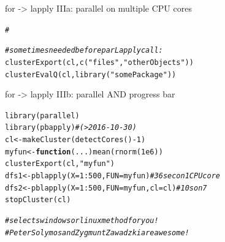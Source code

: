 \documentclass[xcolor=table,           xcolor=dvipsnames]{beamer}\usepackage[]{graphicx}\usepackage[]{color}
\makeatletter
\newcommand{\hlnum}[1]{\textcolor[rgb]{0,0,0}{#1}}
\newcommand{\hlstr}[1]{\textcolor[rgb]{0.545,0.137,0.137}{#1}}
\newcommand{\hlcom}[1]{\textcolor[rgb]{0,0.392,0}{\textit{#1}}}
\newcommand{\hlopt}[1]{\textcolor[rgb]{0,0,0}{#1}}
\newcommand{\hlstd}[1]{\textcolor[rgb]{0,0,0}{#1}}
\newcommand{\hlkwa}[1]{\textcolor[rgb]{1,0,0}{\textbf{#1}}}
\newcommand{\hlkwb}[1]{\textcolor[rgb]{0,0,0}{#1}}
\newcommand{\hlkwc}[1]{\textcolor[rgb]{1,0,1}{#1}}
\newcommand{\hlkwd}[1]{\textcolor[rgb]{0,0,1}{#1}}
\newenvironment{kframe}{%
 \def\at@end@of@kframe{}%
 \ifinner\ifhmode%
  \def\at@end@of@kframe{\end{minipage}}%
  \begin{minipage}{\columnwidth}%
 \fi\fi%
 \def\FrameCommand##1{\hskip\@totalleftmargin \hskip-\fboxsep
 \colorbox{shadecolor}{##1}\hskip-\fboxsep
     \hskip-\linewidth \hskip-\@totalleftmargin \hskip\columnwidth}%
 \MakeFramed {\advance\hsize-\width
   \@totalleftmargin\z@ \linewidth\hsize
   \@setminipage}}%
 {\par\unskip\endMakeFramed%
 \at@end@of@kframe}
\newenvironment{knitrout}{}{} %
\makeatother
\begin{document}
\begin{frame}[fragile]{for -> lapply IIIa: parallel on multiple CPU cores}
\begin{knitrout}
\begin{kframe}
\begin{alltt}
\hlcom{#}
\end{alltt}
\end{kframe}
\end{knitrout}
\pause \vspace{-2.6em}
\begin{knitrout}
\color{fgcolor}\begin{kframe}
\begin{alltt}
\hlcom{# sometimes needed before parLapply call:}
\hlkwd{clusterExport}\hlstd{(cl,} \hlkwd{c}\hlstd{(}\hlstr{"files"}\hlstd{,}\hlstr{"otherObjects"}\hlstd{))}
\hlkwd{clusterEvalQ}\hlstd{(cl,} \hlkwd{library}\hlstd{(}\hlstr{"somePackage"}\hlstd{))}
\end{alltt}
\end{kframe}
\end{knitrout}
\end{frame}


\begin{frame}[fragile]{for -> lapply IIIb: parallel AND progress bar}
\vspace{-1em}
\begin{knitrout}
\color{fgcolor}\begin{kframe}
\begin{alltt}
\hlkwd{library}\hlstd{(parallel)}
\hlkwd{library}\hlstd{(pbapply)} \hlcom{# (>2016-10-30)}
\hlstd{cl} \hlkwb{<-} \hlkwd{makeCluster}\hlstd{(} \hlkwd{detectCores}\hlstd{()}\hlopt{-}\hlnum{1} \hlstd{)}
\hlstd{myfun} \hlkwb{<-} \hlkwa{function}\hlstd{(}\hlkwc{...}\hlstd{)} \hlkwd{mean}\hlstd{(}\hlkwd{rnorm}\hlstd{(}\hlnum{1e6}\hlstd{))}
\hlkwd{clusterExport}\hlstd{(cl,} \hlstr{"myfun"}\hlstd{)}
\hlstd{dfs1} \hlkwb{<-} \hlkwd{pblapply}\hlstd{(}\hlkwc{X}\hlstd{=}\hlnum{1}\hlopt{:}\hlnum{500}\hlstd{,} \hlkwc{FUN}\hlstd{=myfun)} \hlcom{# 36 sec on 1 CPU core}
\hlstd{dfs2} \hlkwb{<-} \hlkwd{pblapply}\hlstd{(}\hlkwc{X}\hlstd{=}\hlnum{1}\hlopt{:}\hlnum{500}\hlstd{,} \hlkwc{FUN}\hlstd{=myfun,} \hlkwc{cl}\hlstd{=cl)} \hlcom{# 10 s on 7}
\hlkwd{stopCluster}\hlstd{(cl)}

\hlcom{# selects windows or linux method for you!}
\hlcom{# Peter Solymos and Zygmunt Zawadzki are awesome!}
\end{alltt}
\end{kframe}
\end{knitrout}
\end{frame}
\end{document}
